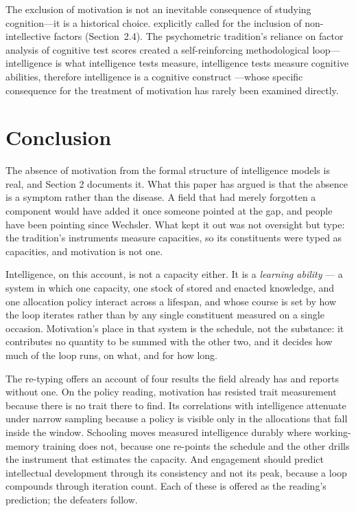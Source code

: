 \documentclass[12pt,a4paper]{article}
\begin{document}
The exclusion of motivation is not an inevitable consequence of studying cognition---\hspace{0pt}it is a historical choice. \citet{Wechsler1940,Wechsler1943} explicitly called for the inclusion of non-intellective factors (Section~2.4). The psychometric tradition's reliance on factor analysis of cognitive test scores created a self-reinforcing methodological loop---\hspace{0pt}intelligence is what intelligence tests measure, intelligence tests measure cognitive abilities, therefore intelligence is a cognitive construct \citep{Sternberg1985}---\hspace{0pt}whose specific consequence for the treatment of motivation has rarely been examined directly.


\section{Conclusion}

The absence of motivation from the formal structure of intelligence models is real, and Section 2 documents it. What this paper has argued is that the absence is a symptom rather than the disease. A field that had merely forgotten a component would have added it once someone pointed at the gap, and people have been pointing since Wechsler. What kept it out was not oversight but type: the tradition's instruments measure capacities, so its constituents were typed as capacities, and motivation is not one.

Intelligence, on this account, is not a capacity either. It is a \emph{learning ability} ---\hspace{0pt} a system in which one capacity, one stock of stored and enacted knowledge, and one allocation policy interact across a lifespan, and whose course is set by how the loop iterates rather than by any single constituent measured on a single occasion. Motivation's place in that system is the schedule, not the substance: it contributes no quantity to be summed with the other two, and it decides how much of the loop runs, on what, and for how long.

The re-typing offers an account of four results the field already has and reports without one. On the policy reading, motivation has resisted trait measurement because there is no trait there to find. Its correlations with intelligence attenuate under narrow sampling because a policy is visible only in the allocations that fall inside the window. Schooling moves measured intelligence durably where working-memory training does not, because one re-points the schedule and the other drills the instrument that estimates the capacity. And engagement should predict intellectual development through its consistency and not its peak, because a loop compounds through iteration count. Each of these is offered as the reading's prediction; the defeaters follow.
\end{document}
